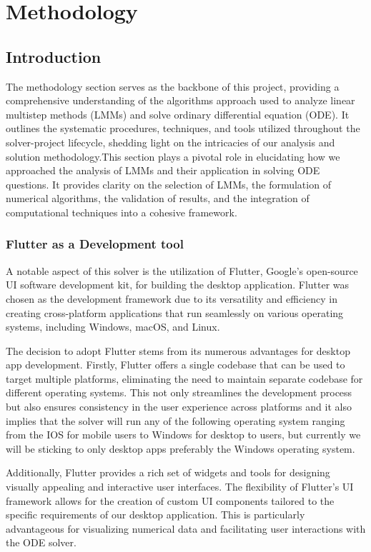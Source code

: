 \chapter{Methodology}

\section{Introduction}
The methodology section serves as the backbone of this project, providing a comprehensive understanding of the algorithms approach used to analyze linear multistep methods (LMMs) and solve ordinary differential equation (ODE). It outlines the systematic procedures, techniques, and tools utilized throughout the solver-project lifecycle, shedding light on the intricacies of our analysis and solution methodology.This section plays a pivotal role in elucidating how we approached the analysis of LMMs and their application in solving ODE questions. It provides clarity on the selection of LMMs, the formulation of numerical algorithms, the validation of results, and the integration of computational techniques into a cohesive framework.


\subsection*{Flutter as a Development tool}
A notable aspect of this solver is the utilization of Flutter, Google's open-source UI software development kit, for building the desktop application. Flutter was chosen as the development framework due to its versatility and efficiency in creating cross-platform applications that run seamlessly on various operating systems, including Windows, macOS, and Linux.

The decision to adopt Flutter stems from its numerous advantages for desktop app development. Firstly, Flutter offers a single codebase that can be used to target multiple platforms, eliminating the need to maintain separate codebase for different operating systems. This not only streamlines the development process but also ensures consistency in the user experience across platforms and it also implies that the solver will run any of the following operating system ranging from the IOS for mobile users to Windows for desktop to users, but currently we will be sticking to only desktop apps preferably the Windows operating system.

Additionally, Flutter provides a rich set of widgets and tools for designing visually appealing and interactive user interfaces. The flexibility of Flutter's UI framework allows for the creation of custom UI components tailored to the specific requirements of our desktop application. This is particularly advantageous for visualizing numerical data and facilitating user interactions with the ODE solver.

